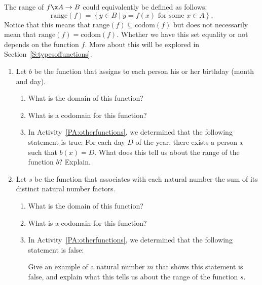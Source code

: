 \noindent
The range of  $f\x A \to B $ could equivalently be defined as follows:
\[
\text{range}( f ) = \left\{ { {y \in B} \mid y = f\left( x \right)\text{ for some }x \in A} \right\}\!.
\]
Notice that this means that $\text{range} (f) \subseteq \text{codom} (f)$ but does not necessarily mean that 
$\text{range} (f) = \text{codom} (f)$.  Whether we have this set equality or not depends on the function $f$.  More about this will be explored in Section~\ref{S:typesoffunctions}.
\hbreak
%
\begin{prog} \label{pr:codomainandrange} \hfill 
\begin{enumerate}
\item Let  $b$  be the function that assigns to each person his or her birthday (month and day).
\begin{enumerate}
  \item What is the domain of this function?

  \item What is a codomain for this function?

  \item In \typeu Activity~\ref*{PA:otherfunctions}, we determined that the following statement is true:  For each day  $D$  of the year, there exists a person  $x$  such that  
$b( x ) = D$.
What does this tell us about the range of the function  $b$?  Explain.
\end{enumerate}

\item Let  $s$  be the function that associates with each natural number the sum of its distinct natural number factors.

\begin{enumerate}
  \item What is the domain of this function?

  \item What is a codomain for this function?

  \item In \typeu Activity~\ref*{PA:otherfunctions}, we determined that the following statement is false:


Give an example of a natural number  $m$  that shows this statement is false, and explain what this tells us about the  range of the function  $s$\!.
\end{enumerate}

\end{enumerate}
\end{prog}
\hbreak

\endinput
